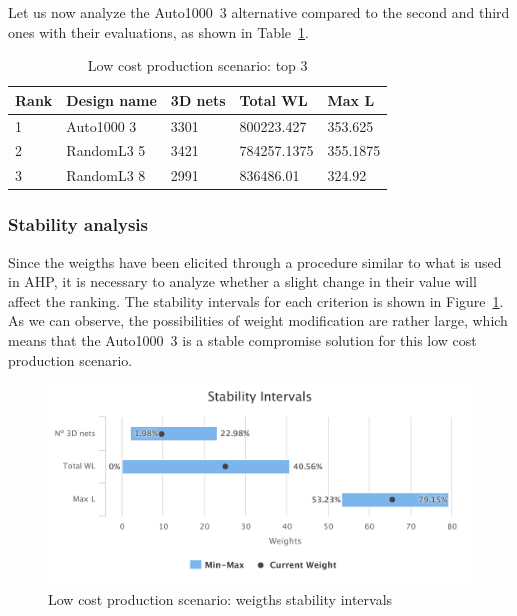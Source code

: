 \documentclass{svmult}
\begin{document}
Let us now analyze the Auto1000~3 alternative compared to the second and third ones with their evaluations, as shown in Table~\ref{tab:top3cost}.

\begin{table}[h!]
    \begin{center}
        \caption{Low cost production scenario: top 3}
        \label{tab:top3cost}
        \begin{tabular}{p{1.2cm}p{2.3cm}p{1.5cm}p{2cm}p{1.3cm}}
            \hline
            Rank & Design name & 3D nets & Total WL & Max L\\
            \hline
            1 & Auto1000 3 & 3301 & 800223.427 & 353.625 \\
            2 & RandomL3 5 & 3421 & 784257.1375 & 355.1875 \\
            3 & RandomL3 8 & 2991 & 836486.01 & 324.92 \\
            \hline
        \end{tabular}
    \end{center}
\end{table}

\subsubsection*{Stability analysis}
Since the weigths have been elicited through a procedure similar to what is used in AHP, it is necessary to analyze whether a slight change in their value will affect the ranking. The stability intervals for each criterion is shown in Figure~\ref{fig:stabilitycost}. As we can observe, the possibilities of weight modification are rather large, which means that the Auto1000~3 is a stable compromise solution for this low cost production scenario.

\begin{figure}[h!]
    \centering
    \includegraphics[width=\linewidth]{stabilitycost}
    \caption{Low cost production scenario: weigths stability intervals}
    \label{fig:stabilitycost}
\end{figure}
\end{document}
